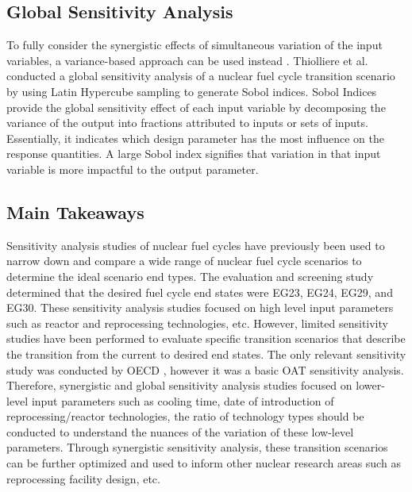\subsection{Global Sensitivity Analysis}
\label{sec:sobol}
To fully consider the synergistic effects of
simultaneous variation of the input variables, a variance-based 
approach can be used instead \cite{thiolliere_methodology_2018}.
Thiolliere et al. conducted a global sensitivity analysis of a 
nuclear fuel cycle transition scenario by using Latin Hypercube sampling 
to generate Sobol indices. 
Sobol Indices provide the global sensitivity effect of each 
input variable by decomposing the variance of the output into 
fractions attributed to inputs or sets of inputs.
Essentially, it indicates which design parameter has 
the most influence on the response quantities.
A large Sobol index signifies that variation in that input 
variable is more impactful to the output parameter.

\subsection{Main Takeaways}
Sensitivity analysis studies of nuclear fuel cycles have previously been used to narrow 
down and compare a wide range of nuclear fuel cycle scenarios to determine 
the ideal scenario end types. 
The evaluation and screening study determined that the desired 
fuel cycle end states were EG23, EG24, EG29, and EG30.
These sensitivity analysis studies focused on high level input 
parameters such as reactor and reprocessing technologies, etc.
However, limited sensitivity studies have been performed to 
evaluate specific transition scenarios that describe the transition 
from the current to desired end states.
The only relevant sensitivity study was conducted by OECD 
\cite{noauthor_effects_2017}, however it was a basic OAT 
sensitivity analysis.   
Therefore, synergistic and global sensitivity analysis studies focused on
lower-level input parameters such as cooling time, 
date of introduction of reprocessing/reactor 
technologies, the ratio of technology types should be conducted to 
understand the nuances of the variation of these low-level parameters. 
Through synergistic sensitivity analysis, these transition scenarios can be 
further optimized and used to inform other nuclear research areas 
such as reprocessing facility design, etc. 